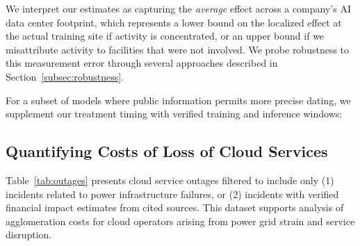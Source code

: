 \documentclass[a4paper,fleqn,longmktitle]{cas-sc}
\begin{document}
We interpret our estimates as capturing the \textit{average} effect across a company's AI data center footprint, which represents a lower bound on the localized effect at the actual training site if activity is concentrated, or an upper bound if we misattribute activity to facilities that were not involved. We probe robustness to this measurement error through several approaches described in Section~\ref{subsec:robustness}.

For a subset of models where public information permits more precise dating, we supplement our treatment timing with verified training and inference windows:

\subsection{Quantifying Costs of Loss of Cloud Services}\label{app:outage_costs}

Table~\ref{tab:outages} presents cloud service outages filtered to include only (1) incidents related to power infrastructure failures, or (2) incidents with verified financial impact estimates from cited sources. This dataset supports analysis of agglomeration costs for cloud operators arising from power grid strain and service disruption.
\end{document}
